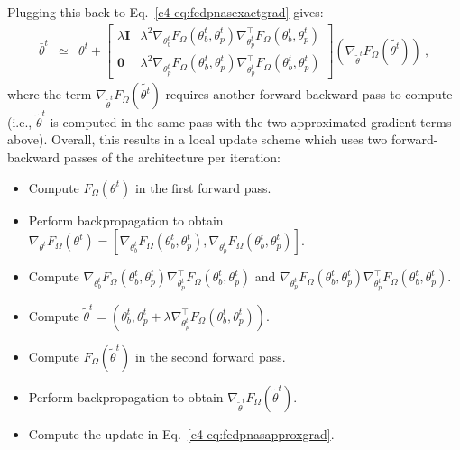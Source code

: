 Plugging this back to Eq.~\eqref{c4-eq:fedpnasexactgrad} gives:
\begin{eqnarray}
\bar{\theta}^t &\simeq& 
\theta^t + 
\left[
\begin{array}{cc}
     \lambda \mathbf{I} & \lambda^2 \nabla_{\theta^t_b} F_{\Omega}(\theta^t_b, \theta^t_p)\nabla^\top_{\theta^t_p} F_{\Omega}(\theta^t_b, \theta^t_p) \\
     \mathbf{0} & \lambda^2
     \nabla_{\theta^t_p} F_{\Omega}(\theta^t_b, \theta^t_p)\nabla^\top_{\theta^t_p} F_{\Omega}(\theta^t_b, \theta^t_p)
\end{array}
\right]
\left(\nabla_{\tilde \theta^t} F_{\Omega}(\tilde{\theta^t})\right) \ ,
\label{c4-eq:fedpnasapproxgrad}
\end{eqnarray}
where the term $\nabla_{\tilde \theta^t} F_{\Omega}(\tilde{\theta^t})$ requires another forward-backward pass to compute (i.e., $\tilde{\theta}^t$ is computed in the same pass with the two approximated gradient terms above). Overall, this results in a local update scheme which uses two forward-backward passes of the architecture per iteration:
\begin{itemize}
    \item Compute $F_{\Omega}(\theta^t)$ in the first forward pass.
    \item Perform backpropagation to obtain $\nabla_{\theta^t} F_{\Omega}(\theta^t) = \left[\nabla_{\theta^t_b} F_{\Omega}(\theta^t_b,\theta^t_p), \nabla_{\theta^t_p} F_{\Omega}(\theta^t_b,\theta^t_p)\right]$. 
    \item Compute  $\nabla_{\theta^t_b} F_{\Omega}(\theta^t_b, \theta^t_p)\nabla^\top_{\theta^t_p} F_{\Omega}(\theta^t_b, \theta^t_p)$ and  $\nabla_{\theta^t_p} F_{\Omega}(\theta^t_b, \theta^t_p)\nabla^\top_{\theta^t_p} F_{\Omega}(\theta^t_b, \theta^t_p)$.
    \item Compute $\tilde{\theta}^t = \left(\theta^t_b, \theta^t_p + \lambda \nabla^\top_{\theta^t_p} F_{\Omega}(\theta^t_b, \theta^t_p)\right)$.
    \item Compute $F_{\Omega}(\tilde{\theta}^t)$ in the second forward pass.
    \item Perform backpropagation to obtain $\nabla_{\tilde{\theta}^t} F_{\Omega}(\tilde{\theta}^t)$.
    \item Compute the update in Eq.~\eqref{c4-eq:fedpnasapproxgrad}.
\end{itemize}

